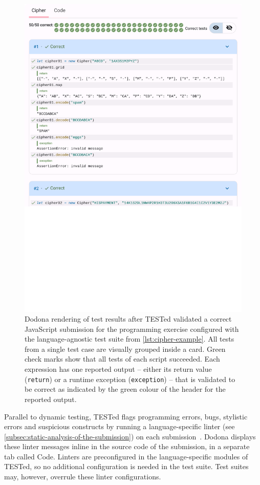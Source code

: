 \documentclass[../main]{subfiles}
\begin{document}
\begin{figure}
    \centering
    \includegraphics[width=\textwidth]{render-cipher}
    \caption{
        Dodona rendering of test results after TESTed validated a correct JavaScript submission for the programming exercise configured with the language-agnostic test suite from \cref{lst:cipher-example}.
        All tests from a single test case are visually grouped inside a card.
        Green check marks show that all tests of each script succeeded.
        Each expression has one reported output -- either its return value (\texttt{return}) or a runtime exception (\texttt{exception}) -- that is validated to be correct as indicated by the green colour of the header for the reported output.
    }
    \label{fig:dodona-render-cipher}
\end{figure}

Parallel to dynamic testing, TESTed flags programming errors, bugs, stylistic errors and suspicious constructs by running a language-specific linter (see \cref{subsec:static-analysis-of-the-submission}) on each submission~\autocite{truongLearningProgramWeb2005}.
Dodona displays these linter messages inline in the source code of the submission, in a separate tab called Code.
Linters are preconfigured in the language-specific modules of TESTed, so no additional configuration is needed in the test suite.
Test suites may, however, overrule these linter configurations.
\end{document}

